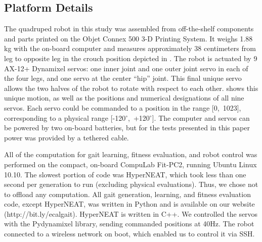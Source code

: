 \subsection{Platform Details}






The quadruped robot in this study was assembled from off-the-shelf components and parts
printed on the Objet Connex 500 3-D Printing System. It weighs 1.88 kg
with the on-board computer and measures approximately 38 centimeters
from leg to opposite leg in the crouch position depicted in
. The robot is actuated by 9 AX-12+
Dynamixel servos: one inner joint and one outer joint servo in each of
the four legs, and one servo at the center ``hip'' joint.  This final
unique servo allows the two halves of the robot to rotate with respect
to each other.  shows this unique motion, as well
as the positions and numerical designations of all nine servos.  Each
servo could be commanded to a position in the range [0,~1023],
corresponding to a physical range [-120$^{\circ}$,~+120$^{\circ}$].
The computer and servos can be powered by two on-board batteries, but
for the tests presented in this paper power was provided by a tethered
cable.

All of the computation for gait learning, fitness evaluation, and
robot control was performed on the compact, on-board CompuLab Fit-PC2,
running Ubuntu Linux 10.10. The slowest portion of code was HyperNEAT, which took
less than one second per generation to run (excluding physical evaluations). Thus,
we chose not to offload any computation.
All gait generation, learning, and fitness
evaluation code, except HyperNEAT, was written in Python and is
available on our website (http://bit.ly/ecalgait).  HyperNEAT is written in
C++.  We controlled the servos with the Pydynamixel library, sending commanded positions at 40Hz.  The robot
connected to a wireless network on boot, which enabled us to control
it via SSH.


